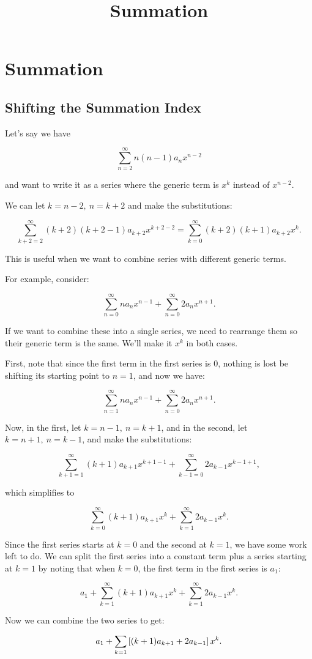 \documentclass{article}
\title{Summation}
\begin{document}
\section{Summation}

\subsection{Shifting the Summation Index}

Let's say we have

\[ \sum_{n=2}^{\infty}{n(n-1)a_nx^{n-2}} \]

and want to write it as a series where the generic term is $x^k$ instead of $x^{n-2}$.

We can let $k = n - 2, ~ n = k + 2$ and make the substitutions:

\[ \sum_{k + 2 = 2}^{\infty}{(k+2)(k + 2 - 1)a_{k+2}x^{k + 2 - 2}} = \sum_{k = 0}^{\infty}{(k+2)(k + 1)a_{k+2}x^{k}}. \]

This is useful when we want to combine series with different generic terms.

For example, consider:

\[ \sum_{n=0}^{\infty}{na_nx^{n-1}} + \sum_{n=0}^{\infty}{2a_nx^{n+1}}. \tag{a} \]

If we want to combine these into a single series, we need to rearrange them so their generic term is the same. We'll make it $x^k$ in both cases.

First, note that since the first term in the first series is $0$, nothing is lost be shifting its starting point to $n = 1$, and now we have:

\[ \sum_{n=1}^{\infty}{na_nx^{n-1}} + \sum_{n=0}^{\infty}{2a_nx^{n+1}}. \tag{b} \]

Now, in the first, let $k = n - 1, ~ n = k + 1$, and in the second, let $k = n + 1, ~ n = k -1$, and make the substitutions:

\[ \sum_{k + 1 = 1}^{\infty}{(k+1)a_{k+1}x^{k+1-1}} + \sum_{k - 1 = 0}^{\infty}{2a_{k-1}x^{k-1+1}}, \tag{c} \]

which simplifies to

\[ \sum_{k=0}^{\infty}{(k+1)a_{k+1}x^{k}} + \sum_{k = 1}^{\infty}{2a_{k-1}x^{k}}. \tag{d} \]

Since the first series starts at $k=0$ and the second at $k=1$, we have some work left to do. We can split the first series into a constant term plus a series starting at $k=1$ by noting that when $k=0$, the first term in the first series is $a_1$:

\[ a_1 + \sum_{k=1}^{\infty}{(k+1)a_{k+1}x^{k}} + \sum_{k = 1}^{\infty}{2a_{k-1}x^{k}}. \tag{e} \]

Now we can combine the two series to get:

\[ a_1 + \sum_{k=1}{\left[(k+1)a_{k+1} + 2a_{k-1}\right] x^k}. \]
\end{document}
